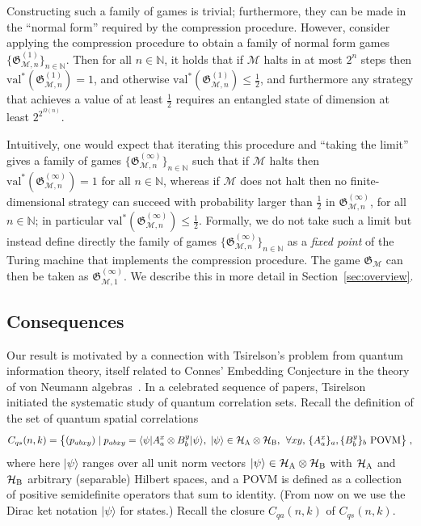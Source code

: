 \documentclass[11pt]{article}
\theoremstyle{definition}
\newcommand{\ket}[1]{|#1\rangle}
\newcommand{\bra}[1]{\langle#1|}
\newcommand{\N}{\ensuremath{\mathbb{N}}}
\newcommand{\mH}{\ensuremath{\mathcal{H}}}
\newcommand{\cM}{\ensuremath{\mathcal{M}}}
\newcommand{\val}{\ensuremath{\mathrm{val}}}
\newcommand{\game}{\mathfrak{G}}
\newcommand{\labelstyle}[1]{\ensuremath{\textsc{#1}}\xspace}
\newcommand{\alice}{\labelstyle{A}}
\newcommand{\bob}{\labelstyle{B}}
\begin{document}
Constructing such a family of games is trivial; furthermore, they can be made in the  ``normal form'' required by the compression procedure. However, consider applying the compression procedure to obtain a family of normal form games $\{ \game_{\cM,n}^{(1)} \}_{n\in\N}$. Then for all $n \in \N$, it holds that if $\cM$ halts in at most $2^n$ steps then $\val^*(\game_{\cM,n}^{(1)})=1$, and otherwise $\val^*(\game_{\cM,n}^{(1)})\leq \frac{1}{2}$, and furthermore any strategy that achieves a value of at least $\frac{1}{2}$ requires an entangled state of dimension at least $2^{2^{\Omega(n)}}$.



Intuitively, one would expect that iterating this procedure and ``taking the limit'' gives a family of games $\{ \game_{\cM,n}^{(\infty)} \}_{n\in\N}$ such that if $\cM$ halts then $\val^*(\game_{\cM,n}^{(\infty)})=1$ for all $n \in \N$, whereas if $\cM$ does not halt then no finite-dimensional strategy can succeed with probability larger than $\frac{1}{2}$ in $\game_{\cM,n}^{(\infty)}$, for all $n \in \N$; in particular $\val^*(\game_{\cM,n}^{(\infty)})\leq \frac{1}{2}$. 
Formally, we do not take such a limit but instead define directly the family of games $\{ \game_{\cM,n}^{(\infty)} \}_{n\in\N}$ as a \emph{fixed point} of the Turing machine that implements the compression procedure. The game $\game_\cM$ can then be taken as $\game_{\cM,1}^{(\infty)}$. We describe this in more detail in Section~\ref{sec:overview}. 


	
	
	
	





	

\subsection{Consequences}
\label{sec:consequences}

	Our result is motivated by a connection with Tsirelson's problem from quantum information theory, itself related to Connes' Embedding Conjecture in the theory of von Neumann algebras~\cite{connes1976classification}. 
In a celebrated sequence of papers, Tsirelson~\cite{tsirelson1993some} initiated the systematic study of quantum correlation sets. Recall the definition of the set of quantum spatial correlations 
\begin{equation}
\label{eq:spatial}
	C_{qs}(n,k) = \big\{ (p_{abxy} ) \mid p_{abxy} = \bra{\psi} A^x_a \otimes B^y_b \ket{\psi}, \; \ket{\psi} \in  \mH_\alice \otimes \mH_\bob,\,\;\forall xy,\, \{A^x_a\}_a,\{B^y_b\}_b\text{ POVM}\big\}\;,
\end{equation}
where here $\ket{\psi}$ ranges over all unit norm vectors $\ket{\psi} \in \mH_\alice \otimes \mH_\bob$ with $\mH_\alice$ and $\mH_\bob$ arbitrary (separable) Hilbert spaces, and a POVM is defined as a collection of positive semidefinite operators that sum to identity. (From now on we use the Dirac ket notation $\ket{\psi}$ for states.) Recall the closure $C_{qa}(n,k)$ of $C_{qs}(n,k)$.
\end{document}

